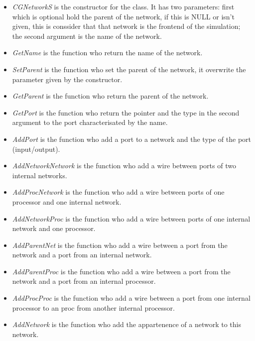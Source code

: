 \documentclass[a4paper,oneside,notitlepage]{article}
\begin{document}
\begin{itemize}
\item \textit{CGNetworkS} is the constructor for the class. It has two
parameters: first which is optional hold the parent of the network, if this
is NULL or isn't given, this is conssider that that network is the frontend
of the simulation; the second argument is the name of the network.

\item \textit{GetName} is the function who return the name of the network.

\item \textit{SetParent} is the function who set the parent of the network,
it overwrite the parameter given by the constructor.

\item \textit{GetParent} is the function who return the parent of the
network.

\item \textit{GetPort} is the function who return the pointer and the type
in the second argument to the port characterisated by the name.

\item \textit{AddPort} is the function who add a port to a network and the
type of the port (input/output).

\item \textit{AddNetworkNetwork} is the function who add a wire between
ports of two internal networks.

\item \textit{AddProcNetwork} is the function who add a wire between ports
of one processor and one internal network.

\item \textit{AddNetworkProc} is the function who add a wire between ports
of one internal network and one processor.

\item \textit{AddParentNet} is the function who add a wire between a port
from the network and a port from an internal network.

\item \textit{AddParentProc} is the function who add a wire between a port
from the network and a port from an internal processor.

\item \textit{AddProcProc} is the function who add a wire between a port
from one internal processor to an proc from another internal processor.

\item \textit{AddNetwork} is the function who add the appartenence of a
network to this network.


\end{itemize}
\end{document}
